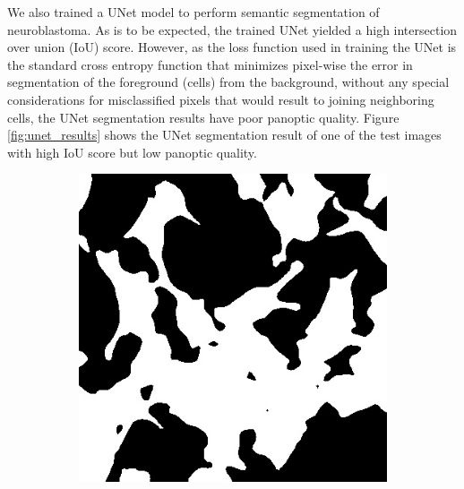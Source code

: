\documentclass[journal]{IEEEtran}
\begin{document}
We also trained a UNet model to perform semantic segmentation of neuroblastoma. As is to be expected, the trained UNet yielded a high intersection over union (IoU) score. However, as the loss function used in training the UNet is the standard cross entropy function that minimizes pixel-wise the error in segmentation of the foreground (cells) from the background, without any special considerations for misclassified pixels that would result to joining neighboring cells, the UNet segmentation results have poor panoptic quality. Figure \ref{fig:unet_results} shows the UNet segmentation result of one of the test images with high IoU score but low panoptic quality.

\begin{figure}
\centering
\begin{subfigure}[b]{0.45\linewidth}
\includegraphics[width=\linewidth]{deeplab/110115.jpg}
\caption{}
\end{subfigure}
\begin{subfigure}[b]{0.45\linewidth}

\end{subfigure}
\end{figure}
\end{document}

